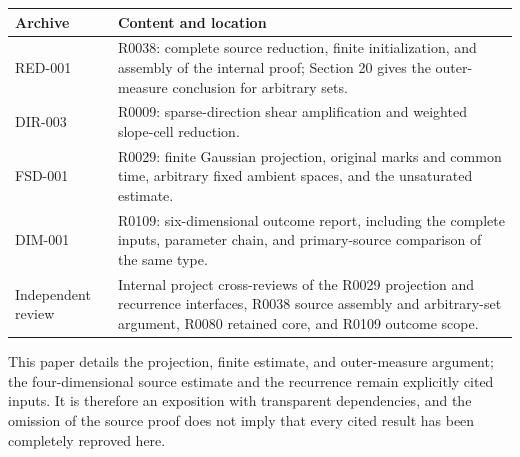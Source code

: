 \begin{longtable}{@{}p{}p{}@{}}
 \toprule
 Archive & Content and location \\
 \midrule
 \endhead
 RED-001 & R0038: complete source reduction, finite initialization, and assembly of the internal proof; Section 20 gives the outer-measure conclusion for arbitrary sets.\\
 DIR-003 & R0009: sparse-direction shear amplification and weighted slope-cell reduction.\\
 FSD-001 & R0029: finite Gaussian projection, original marks and common time, arbitrary fixed ambient spaces, and the unsaturated estimate.\\
 DIM-001 & R0109: six-dimensional outcome report, including the complete inputs, parameter chain, and primary-source comparison of the same type.\\
 Independent review & Internal project cross-reviews of the R0029 projection and recurrence interfaces, R0038 source assembly and arbitrary-set argument, R0080 retained core, and R0109 outcome scope.\\
 \bottomrule
\end{longtable}
This paper details the projection, finite estimate, and outer-measure argument;
the four-dimensional source estimate and the recurrence remain explicitly cited inputs.
It is therefore an exposition with transparent dependencies, and the omission of the source proof does not imply that every cited result has been completely reproved here.
